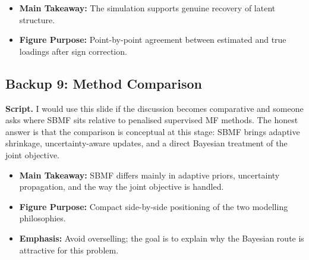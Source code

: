 \documentclass[11pt]{article}
\newcommand{\scriptlabel}{\textbf{Script. }}
\newcommand{\sectionlabel}[1]{\textbf{#1}}
\begin{document}
\begin{itemize}
\item \sectionlabel{Main Takeaway:} The simulation supports genuine recovery of latent structure.
\item \sectionlabel{Figure Purpose:} Point-by-point agreement between estimated and true loadings after sign correction.
\end{itemize}

\subsection*{Backup 9: Method Comparison}
\scriptlabel I would use this slide if the discussion becomes comparative and someone asks where SBMF sits relative to penalised supervised MF methods. The honest answer is that the comparison is conceptual at this stage: SBMF brings adaptive shrinkage, uncertainty-aware updates, and a direct Bayesian treatment of the joint objective.

\begin{itemize}
\item \sectionlabel{Main Takeaway:} SBMF differs mainly in adaptive priors, uncertainty propagation, and the way the joint objective is handled.
\item \sectionlabel{Figure Purpose:} Compact side-by-side positioning of the two modelling philosophies.
\item \sectionlabel{Emphasis:} Avoid overselling; the goal is to explain why the Bayesian route is attractive for this problem.
\end{itemize}
\end{document}
